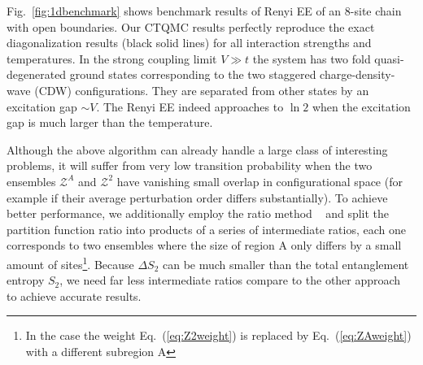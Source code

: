 \documentclass[12pt,onecolumn,english,prl,showpacs,nofootinbib]{revtex4-1}
\begin{document}
Fig.~\ref{fig:1dbenchmark} shows benchmark results of Renyi EE of an $8$-site chain with open boundaries. Our CTQMC results perfectly reproduce the exact diagonalization results (black solid lines) for all interaction strengths and temperatures. In the strong coupling limit $V\gg t $ the system has two fold quasi-degenerated ground states corresponding to the two staggered charge-density-wave (CDW) configurations. They are separated from other states by an excitation gap $\sim V$. The Renyi EE indeed approaches to $\ln 2$ when the excitation gap is much larger than the temperature.  
  

Although the above algorithm can already handle a large class of interesting problems, it will suffer from very low transition probability when the two ensembles $\mathcal{Z}^{A}$ and $\mathcal{Z}^{2}$ have vanishing small overlap in configurational space (for example if their average perturbation order differs substantially). To achieve better performance, we additionally employ the ratio method ~\cite{Hastings:2010dca, Humeniuk:2012cq} and split the partition function ratio into products of a series of intermediate ratios, each one corresponds to two ensembles where the size of region A only differs by a small amount of sites\footnote{In the case the weight Eq.~(\ref{eq:Z2weight}) is replaced by Eq.~(\ref{eq:ZAweight}) with a different subregion A}. Because $\Delta S_{2}$ can be much smaller than  the total entanglement entropy $S_{2}$, we need far less intermediate ratios compare to the other approach~\cite{Broecker:2014ud} to achieve accurate results. 
\end{document}
